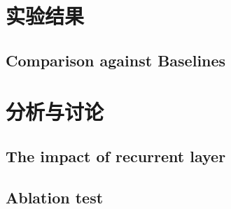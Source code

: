 \section{实验结果}

\subsection{Comparison against Baselines}

\section{分析与讨论}

\subsection{The impact of recurrent layer}

\subsection{Ablation test}

